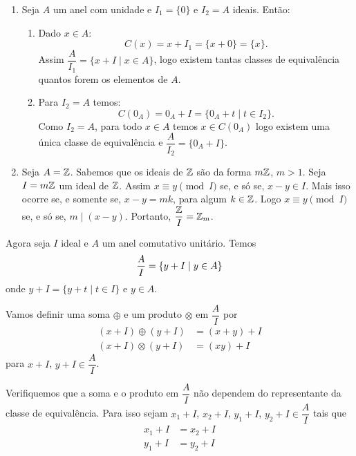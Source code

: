 \begin{exemplos}
    \begin{enumerate}[label={\arabic*})]
        \item Seja $A$ um anel com unidade e $I_{1} = \{0\}$ e $I_{2} = A$ ideais. Ent\~ao:
        \begin{enumerate}[label={\roman*})]
        \item Dado $x \in A$:
        \[
            C(x) = x + I_{1} = \{x + 0\} = \{x\}.
        \]
        Assim $\dfrac{A}{I_{1}} = \{x + I \mid x \in A\}$, logo existem tantas classes de equival{\^e}ncia quantos forem os elementos de $A$.

        \item Para $I_{2} = A$ temos:
        \[
            C(0_A) = 0_A + I = \{0_A + t \mid t \in I_{2}\}.
        \]
        Como $I_2 = A$, para todo $x \in A$ temos $x \in C(0_A)$ logo existem uma \'unica classe de equival\^encia
        e $\dfrac{A}{I_{2}} = \{0_{A} + I\}$.
    \end{enumerate}

    \item Seja $A = \mathbb{Z}$. Sabemos que os ideais de $\mathbb{Z}$ s{\~a}o da forma $m\mathbb{Z}$, $m > 1$. Seja $I = m\mathbb{Z}$ um ideal de $\mathbb{Z}$. Assim $x\equiv y \pmod I$ se, e s\'o se, $x - y \in I$.
        Mais isso ocorre se, e somente se, $x - y = mk $, para algum $k \in \mathbb{Z}$. Logo $x\equiv y \pmod I$ se, e s\'o se, $m\mid (x - y)$. Portanto, $\dfrac{\mathbb{Z}}{I} = \mathbb{Z}_m$.
    \end{enumerate}
\end{exemplos}


Agora seja $I$ ideal e $A$ um anel comutativo unitário. Temos
\[
    \dfrac{A}{I} = \{y + I \mid y \in A\}\\
\]
onde $y + I = \{y + t \mid t \in I\}$ e $y \in A$.

Vamos definir uma soma $\oplus$ e um produto $\otimes$ em $\dfrac{A}{I}$ por
\begin{align*}
    (x + I)\oplus(y + I) &= (x + y) + I\\
    (x + I)\otimes(y + I) &= (xy) + I
\end{align*}
para $x + I$, $y + I \in \dfrac{A}{I}$.

Verifiquemos que a soma e o produto em $\dfrac{A}{I}$ n{\~a}o dependem do representante da classe de equival{\^e}ncia.
Para isso sejam $x_1 + I$, $x_2 + I$, $y_1 + I$, $y_2 + I \in \dfrac{A}{I}$ tais que
\begin{align*}
    x_1 + I &= x_2 + I\\
    y_1 + I &= y_2 + I
\end{align*}

